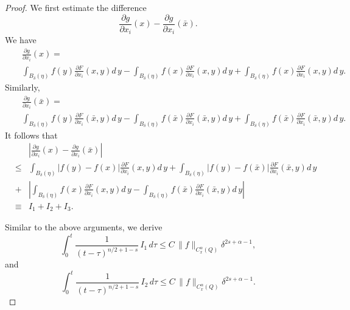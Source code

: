 \documentclass[12pt]{article}
\theoremstyle{remark}
\numberwithin{equation}{section}
\begin{document}
\begin{proof}
We first estimate the difference
$$ \frac{\partial g}{\partial x_i}(x) - \frac{\partial g}{\partial x_i}(\bar{x}).$$
We have
\begin{eqnarray*}
& & \frac{\partial g}{\partial x_i}(x) = \\
& & \int_{B_\delta (\eta)} f(y) \frac{\partial F}{\partial x_i} (x,y) d \, y -  \int_{B_\delta (\eta)} f(x) \frac{\partial F}{\partial x_i} (x,y) d \, y +  \int_{B_\delta (\eta)} f(x) \frac{\partial F}{\partial x_i} (x,y) d \, y.
\end{eqnarray*}
Similarly,
\begin{eqnarray*}
& & \frac{\partial g}{\partial x_i}(\bar{x}) = \\
& & \int_{B_\delta (\eta)} f(y) \frac{\partial F}{\partial x_i} (\bar{x},y) d \, y -  \int_{B_\delta (\eta)} f(\bar{x}) \frac{\partial F}{\partial x_i} (\bar{x},y) d \, y +  \int_{B_\delta (\eta)} f(\bar{x}) \frac{\partial F}{\partial x_i} (\bar{x},y) d \, y.
\end{eqnarray*}
It follows that
\begin{eqnarray}
& & \left|  \frac{\partial g}{\partial x_i}(x) - \frac{\partial g}{\partial x_i}(\bar{x}) \right| \nonumber \\
& \leq & \int_{B_\delta (\eta)} | f(y) - f(x)| \frac{\partial F}{\partial x_i} (x,y) d \, y + \int_{B_\delta (\eta)} |f(y)- f(\bar{x})| \frac{\partial F}{\partial x_i} (\bar{x},y) d \, y \nonumber \\
& + & \left| \int_{B_\delta (\eta)} f(x) \frac{\partial F}{\partial x_i} (x,y) d \, y - \int_{B_\delta (\eta)} f(\bar{x}) \frac{\partial F}{\partial x_i} (\bar{x},y) d \, y \right| \nonumber \\
& \equiv & I_1 + I_2 + I_3.
\label{3.24}
\end{eqnarray}

Similar to the above arguments, we derive
\begin{equation}
\int_0^t \frac{1}{(t-\tau)^{n/2+1-s}} \, I_1 \, d \tau \leq C \, \|f\|_{C_x^\alpha (Q)} \delta^{2s+\alpha-1},
\label{3.25}
\end{equation}
and
\begin{equation}
\int_0^t \frac{1}{(t-\tau)^{n/2+1-s}} \, I_2 \, d \tau \leq C \, \|f\|_{C_x^\alpha (Q)} \delta^{2s+\alpha-1}.
\label{3.26}
\end{equation}


\end{proof}
\end{document}
